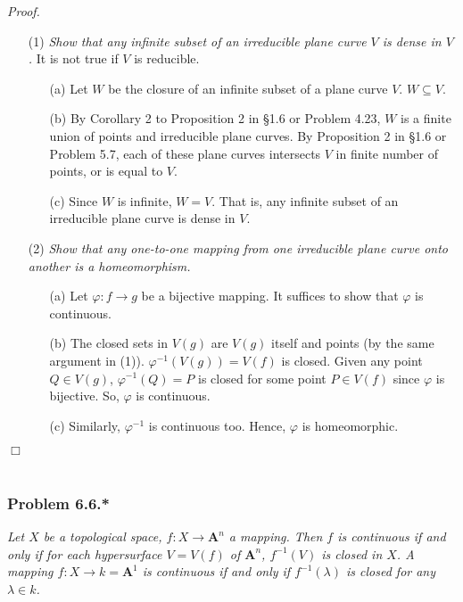 \documentclass{article}
\begin{document}
\emph{Proof.}
\begin{enumerate}
\item[(1)]
  \emph{Show that any infinite subset of an irreducible plane curve $V$ is dense in $V$.}
  It is not true if $V$ is reducible.
  \begin{enumerate}
  \item[(a)]
    Let $W$ be the closure of an infinite subset of a plane curve $V$.
    $W \subseteq V$.

  \item[(b)]
    By Corollary 2 to Proposition 2 in \S 1.6 or Problem 4.23,
    $W$ is a finite union of points and irreducible plane curves.
    By Proposition 2 in \S 1.6 or Problem 5.7,
    each of these plane curves intersects $V$ in finite number of points, or is equal to $V$.

  \item[(c)]
    Since $W$ is infinite, $W = V$.
    That is, any infinite subset of an irreducible plane curve is dense in $V$.
  \end{enumerate}

\item[(2)]
  \emph{Show that any one-to-one mapping from one irreducible plane curve onto another
  is a homeomorphism.}
  \begin{enumerate}
  \item[(a)]
    Let $\varphi: f \to g$ be a bijective mapping.
    It suffices to show that $\varphi$ is continuous.

  \item[(b)]
    The closed sets in $V(g)$ are $V(g)$ itself and points
    (by the same argument in (1)).
    $\varphi^{-1}(V(g)) = V(f)$ is closed.
    Given any point $Q \in V(g)$,
    $\varphi^{-1}(Q) = P$ is closed for some point $P \in V(f)$ since $\varphi$ is bijective.
    So, $\varphi$ is continuous.

  \item[(c)]
    Similarly, $\varphi^{-1}$ is continuous too.
    Hence, $\varphi$ is homeomorphic.
  \end{enumerate}
\end{enumerate}
$\Box$ \\\\






\subsubsection*{Problem 6.6.*}
\emph{Let $X$ be a topological space, $f: X \to \mathbf{A}^{n}$ a mapping.
Then $f$ is continuous if and only if for each hypersurface $V = V(f)$ of $\mathbf{A}^{n}$,
$f^{-1}(V)$ is closed in $X$.
A mapping $f: X \to k = \mathbf{A}^{1}$ is continuous if and only if
$f^{-1}(\lambda)$ is closed for any $\lambda \in k$.} \\
\end{document}
